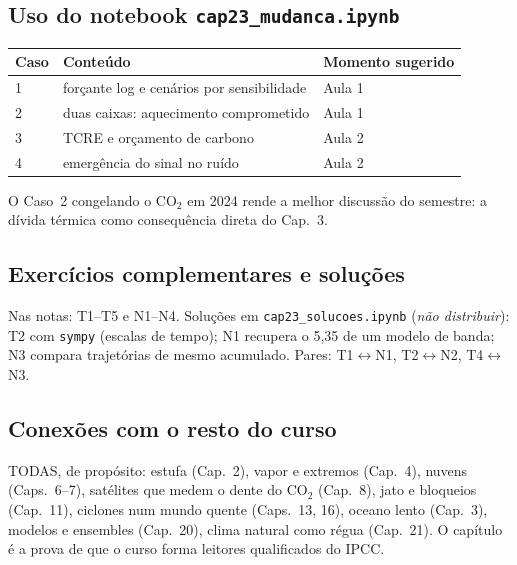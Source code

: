 \subsection*{Uso do notebook \texttt{cap23\_mudanca.ipynb}}

\begin{center}
\begin{tabular}{lll}
\hline
Caso & Conteúdo & Momento sugerido \\
\hline
1 & forçante log e cenários por sensibilidade & Aula 1 \\
2 & duas caixas: aquecimento comprometido & Aula 1 \\
3 & TCRE e orçamento de carbono & Aula 2 \\
4 & emergência do sinal no ruído & Aula 2 \\
\hline
\end{tabular}
\end{center}

O Caso~2 congelando o CO$_2$ em 2024 rende a melhor discussão do
semestre: a dívida térmica como consequência direta do Cap.~3.

\subsection*{Exercícios complementares e soluções}

Nas notas: T1--T5 e N1--N4. Soluções em \texttt{cap23\_solucoes.ipynb}
(\emph{não distribuir}): T2 com \texttt{sympy} (escalas de tempo); N1
recupera o 5,35 de um modelo de banda; N3 compara trajetórias de
mesmo acumulado. Pares: T1$\leftrightarrow$N1, T2$\leftrightarrow$N2,
T4$\leftrightarrow$N3.

\subsection*{Conexões com o resto do curso}

TODAS, de propósito: estufa (Cap.~2), vapor e extremos (Cap.~4),
nuvens (Caps.~6--7), satélites que medem o dente do CO$_2$ (Cap.~8),
jato e bloqueios (Cap.~11), ciclones num mundo quente (Caps.~13, 16),
oceano lento (Cap.~3), modelos e ensembles (Cap.~20), clima natural
como régua (Cap.~21). O capítulo é a prova de que o curso forma
leitores qualificados do IPCC.
